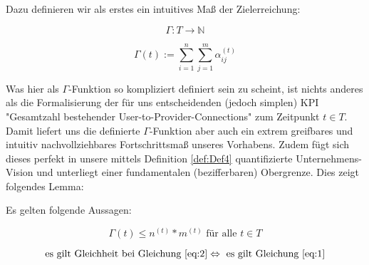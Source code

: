 \documentclass[11pt]{scrartcl}
\begin{document}
Dazu definieren wir als erstes ein intuitives Maß der Zielerreichung:

\vspace{0.3cm}

\begin{Def}\label{def:Def5}
\begin{equation*}
  \Gamma : T \rightarrow \mathbb{N} 
\end{equation*}

\begin{equation*}
  \Gamma(t):= \sum_{i=1}^n \sum_{j=1}^m \alpha^{(t)}_{ij} 
\end{equation*}

\end{Def}

\vspace{1cm}

Was hier als $\Gamma$-Funktion so kompliziert definiert sein zu scheint, ist nichts anderes als die Formalisierung der für uns entscheidenden (jedoch simplen) KPI "Gesamtzahl bestehender User-to-Provider-Connections" zum Zeitpunkt $t \in T$. Damit liefert uns die definierte $\Gamma$-Funktion aber auch ein extrem greifbares und intuitiv nachvollziehbares Fortschrittsmaß unseres Vorhabens. Zudem fügt sich dieses perfekt in unsere mittels Definition \ref{def:Def4} quantifizierte Unternehmens-Vision und unterliegt einer fundamentalen (bezifferbaren) Obergrenze. Dies zeigt folgendes Lemma:

\vspace{0.3cm}

\begin{Lemma}

Es gelten folgende Aussagen:

\begin{equation}
\label{eq:2}
  \Gamma(t) \leqslant n^{(t)} * m^{(t)} \textrm{ für alle } t \in T
\end{equation}

\begin{equation}
\label{eq:3}
  \textrm{es gilt Gleichheit bei Gleichung }  \eqref{eq:2} \Leftrightarrow \textrm{ es gilt Gleichung } \eqref{eq:1}
\end{equation}

\end{Lemma}

\vspace{0.3cm}
\end{document}
